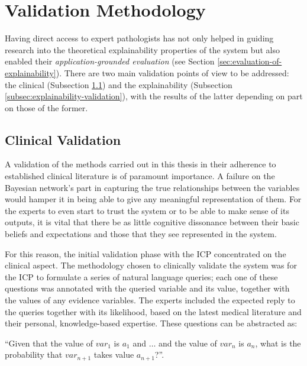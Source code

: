 \section{Validation Methodology} \label{sec:validation}
Having direct access to expert pathologists has not only helped in guiding research into the theoretical explainability properties of the system but also enabled their \textit{application-grounded evaluation} (see Section \ref{sec:evaluation-of-explainability}).
There are two main validation points of view to be addressed: the clinical (Subsection \ref{subsec:clinical-validation-methodology}) and the explainability (Subsection \ref{subsec:explainability-validation}), with the results of the latter depending on part on those of the former.
 
\subsection{Clinical Validation} \label{subsec:clinical-validation-methodology}
A validation of the methods carried out in this thesis in their adherence to established clinical literature is of paramount importance.
A failure on the Bayesian network's part in capturing the true relationships between the variables would hamper it in being able to give any meaningful representation of them.
For the experts to even start to trust the system or to be able to make sense of its outputs, it is vital that there be as little cognitive dissonance between their basic beliefs and expectations and those that they see represented in the system.

For this reason, the initial validation phase with the ICP concentrated on the clinical aspect.
The methodology chosen to clinically validate the system was for the ICP to formulate a series of natural language queries; each one of these questions was annotated with the queried variable and its value, together with the values of any evidence variables.
The experts included the expected reply to the queries together with its likelihood, based on the latest medical literature and their personal, knowledge-based expertise.
These questions can be abstracted as:
\begin{center}
\enquote{Given that the value of $var_1$ is $a_1$ and $\ldots$ and the value of $var_n$ is $a_n$, what is the probability that $var_{n+1}$ takes value $a_{n+1}$?}.	
\end{center}

